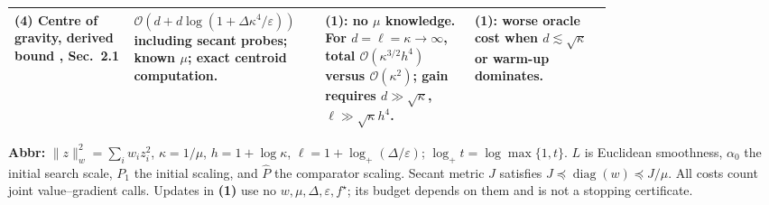 \begin{table}[tp]
\begin{threeparttable}
\begin{tabularx}{\linewidth}{@{}>{\raggedright\arraybackslash}p{0.20\linewidth}>{\raggedright\arraybackslash}p{0.32\linewidth}>{\raggedright\arraybackslash}p{0.25\linewidth}>{\raggedright\arraybackslash}X@{}}
\midrule
\textbf{(4)} Centre of gravity, derived bound \citep{diagBubeckVerified}, Sec.~2.1 & $\mathcal{O}(d+d\log(1+\Delta\kappa^4/\varepsilon))$ including secant probes; known $\mu$; exact centroid computation. & \textbf{(1)}: no $\mu$ knowledge. For $d=\ell=\kappa\to\infty$, total $\mathcal{O}(\kappa^{3/2}h^4)$ versus $\mathcal{O}(\kappa^2)$; gain requires $d\gg\sqrt\kappa$, $\ell\gg\sqrt\kappa h^4$. & \textbf{(1)}: worse oracle cost when $d\lesssim\sqrt\kappa$ or warm-up dominates. \\
\bottomrule
\end{tabularx}
\begin{tablenotes}[flushleft]\footnotesize
\item[] \textbf{Abbr:} $\|z\|_w^2=\sum_iw_i z_i^2$, $\kappa=1/\mu$, $h=1+\log\kappa$, $\ell=1+\log_+(\Delta/\varepsilon)$; $\log_+t=\log\max\{1,t\}$. $L$ is Euclidean smoothness, $\alpha_0$ the initial search scale, $P_1$ the initial scaling, and $\widehat P$ the comparator scaling. Secant metric $J$ satisfies $J\preceq\operatorname{diag}(w)\preceq J/\mu$. All costs count joint value--gradient calls. Updates in \textbf{(1)} use no $w,\mu,\Delta,\varepsilon,f^\star$; its budget depends on them and is not a stopping certificate.
\end{tablenotes}
\end{threeparttable}
\end{table}
\clearpage
